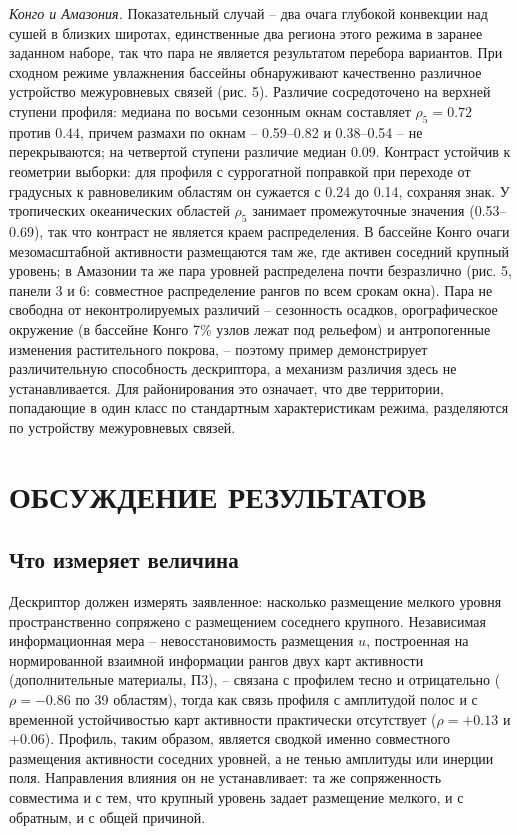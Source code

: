 \documentclass[12pt,a4paper]{article}
\begin{document}
\emph{Конго и Амазония.} Показательный случай -- два очага глубокой конвекции над сушей в близких широтах, единственные два региона этого режима в заранее заданном наборе, так что пара не является результатом перебора вариантов. При сходном режиме увлажнения бассейны обнаруживают качественно различное устройство межуровневых связей (рис. 5). Различие сосредоточено на верхней ступени профиля: медиана по восьми сезонным окнам составляет $\rho_5 = 0.72$ против $0.44$, причем размахи по окнам -- 0.59--0.82 и 0.38--0.54 -- не перекрываются; на четвертой ступени различие медиан 0.09. Контраст устойчив к геометрии выборки: для профиля с суррогатной поправкой при переходе от градусных к равновеликим областям он сужается с 0.24 до 0.14, сохраняя знак. У тропических океанических областей $\rho_5$ занимает промежуточные значения (0.53--0.69), так что контраст не является краем распределения. В бассейне Конго очаги мезомасштабной активности размещаются там же, где активен соседний крупный уровень; в Амазонии та же пара уровней распределена почти безразлично (рис. 5, панели 3 и 6: совместное распределение рангов по всем срокам окна). Пара не свободна от неконтролируемых различий -- сезонность осадков, орографическое окружение (в бассейне Конго 7\% узлов лежат под рельефом) и антропогенные изменения растительного покрова, -- поэтому пример демонстрирует различительную способность дескриптора, а механизм различия здесь не устанавливается. Для районирования это означает, что две территории, попадающие в один класс по стандартным характеристикам режима, разделяются по устройству межуровневых связей.

\section{ОБСУЖДЕНИЕ РЕЗУЛЬТАТОВ}

\subsection{Что измеряет величина}

Дескриптор должен измерять заявленное: насколько размещение мелкого уровня пространственно сопряжено с размещением соседнего крупного. Независимая информационная мера -- невосстановимость размещения $u$, построенная на нормированной взаимной информации рангов двух карт активности (дополнительные материалы, П3), -- связана с профилем тесно и отрицательно ($\rho = -0.86$ по 39 областям), тогда как связь профиля с амплитудой полос и с временной устойчивостью карт активности практически отсутствует ($\rho = +0.13$ и $+0.06$). Профиль, таким образом, является сводкой именно совместного размещения активности соседних уровней, а не тенью амплитуды или инерции поля. Направления влияния он не устанавливает: та же сопряженность совместима и с тем, что крупный уровень задает размещение мелкого, и с обратным, и с общей причиной.
\end{document}
